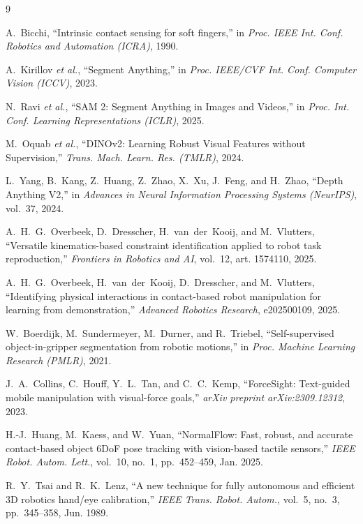 \documentclass[letterpaper, 10pt, journal, twoside]{IEEEtran}
\begin{document}
\begin{thebibliography}{9}

A.~Bicchi, ``Intrinsic contact sensing for soft fingers,'' in
\emph{Proc. IEEE Int. Conf. Robotics and Automation (ICRA)}, 1990.

A.~Kirillov \emph{et al.}, ``Segment Anything,'' in \emph{Proc. IEEE/CVF
Int. Conf. Computer Vision (ICCV)}, 2023.

N.~Ravi \emph{et al.}, ``SAM 2: Segment Anything in Images and Videos,''
in \emph{Proc. Int. Conf. Learning Representations (ICLR)}, 2025.

M.~Oquab \emph{et al.}, ``DINOv2: Learning Robust Visual Features without
Supervision,'' \emph{Trans. Mach. Learn. Res. (TMLR)}, 2024.

L.~Yang, B.~Kang, Z.~Huang, Z.~Zhao, X.~Xu, J.~Feng, and H.~Zhao,
``Depth Anything V2,'' in \emph{Advances in Neural Information
Processing Systems (NeurIPS)}, vol.~37, 2024.

A.~H.~G.~Overbeek, D.~Dresscher, H.~van~der~Kooij, and M.~Vlutters,
``Versatile kinematics-based constraint identification applied to robot
task reproduction,'' \emph{Frontiers in Robotics and AI}, vol.~12, art.
1574110, 2025.

A.~H.~G.~Overbeek, H.~van~der~Kooij, D.~Dresscher, and M.~Vlutters,
``Identifying physical interactions in contact-based robot manipulation
for learning from demonstration,'' \emph{Advanced Robotics Research},
e202500109, 2025.

W.~Boerdijk, M.~Sundermeyer, M.~Durner, and R.~Triebel, ``Self-supervised
object-in-gripper segmentation from robotic motions,'' in \emph{Proc.
Machine Learning Research (PMLR)}, 2021.

J.~A.~Collins, C.~Houff, Y.~L.~Tan, and C.~C.~Kemp, ``ForceSight:
Text-guided mobile manipulation with visual-force goals,'' \emph{arXiv
preprint arXiv:2309.12312}, 2023.

H.-J.~Huang, M.~Kaess, and W.~Yuan, ``NormalFlow: Fast, robust, and
accurate contact-based object 6DoF pose tracking with vision-based
tactile sensors,'' \emph{IEEE Robot. Autom. Lett.}, vol.~10, no.~1,
pp.~452--459, Jan. 2025.

R.~Y.~Tsai and R.~K.~Lenz, ``A new technique for fully autonomous and
efficient 3D robotics hand/eye calibration,'' \emph{IEEE Trans. Robot.
Autom.}, vol.~5, no.~3, pp.~345--358, Jun. 1989.

\end{thebibliography}
\end{document}

